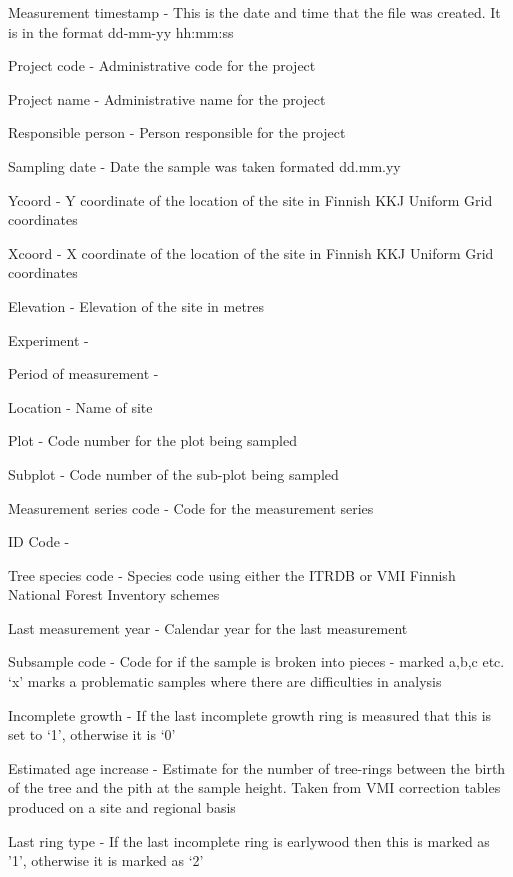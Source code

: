 \begin{description*}
 \item[Measurement timestamp] - This is the date and time that the file was created.  It is in the format dd-mm-yy hh:mm:ss
 \item[Project code] - Administrative code for the project
 \item[Project name] - Administrative name for the project
 \item[Responsible person] - Person responsible for the project
 \item[Sampling date] - Date the sample was taken formated dd.mm.yy
 \item[Ycoord] - Y coordinate of the location of the site in Finnish KKJ Uniform Grid coordinates
 \item[Xcoord]- X coordinate of the location of the site in Finnish KKJ Uniform Grid coordinates
 \item[Elevation] - Elevation of the site in metres
 \item[Experiment] - 
 \item[Period of measurement] - 
 \item[Location] - Name of site
 \item[Plot] - Code number for the plot being sampled
 \item[Subplot] - Code number of the sub-plot being sampled
 \item[Measurement series code] - Code for the measurement series
 \item[ID Code] - 
 \item[Tree species code] - Species code using either the ITRDB or VMI Finnish National Forest Inventory schemes
 \item[Last measurement year] - Calendar year for the last measurement 
 \item[Subsample code] - Code for if the sample is broken into pieces - marked a,b,c etc.  `x' marks a problematic samples where there are difficulties in analysis
 \item[Incomplete growth] - If the last incomplete growth ring is measured that this is set to `1', otherwise it is `0'
 \item[Estimated age increase] - Estimate for the number of tree-rings between the birth of the tree and the pith at the sample height.  Taken from VMI correction tables produced on a site and regional basis
 \item[Last ring type] - If the last incomplete ring is earlywood then this is marked as '1', otherwise it is marked as `2'

\end{description*}
